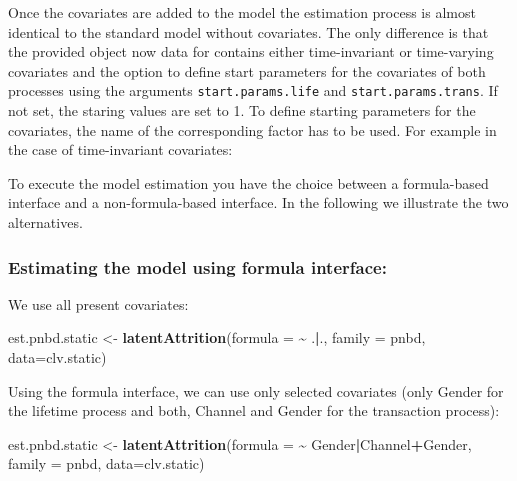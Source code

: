 \documentclass[
]{article}
\newenvironment{Shaded}{\begin{snugshade}}{\end{snugshade}}
\newcommand{\AttributeTok}[1]{\textcolor[rgb]{0.13,0.29,0.53}{#1}}
\newcommand{\FunctionTok}[1]{\textcolor[rgb]{0.13,0.29,0.53}{\textbf{#1}}}
\newcommand{\NormalTok}[1]{#1}
\newcommand{\OtherTok}[1]{\textcolor[rgb]{0.56,0.35,0.01}{#1}}
\newcommand{\SpecialCharTok}[1]{\textcolor[rgb]{0.81,0.36,0.00}{\textbf{#1}}}
\begin{document}
Once the covariates are added to the model the estimation process is
almost identical to the standard model without covariates. The only
difference is that the provided object now data for contains either
time-invariant or time-varying covariates and the option to define start
parameters for the covariates of both processes using the arguments
\texttt{start.params.life} and \texttt{start.params.trans}. If not set,
the staring values are set to 1. To define starting parameters for the
covariates, the name of the corresponding factor has to be used. For
example in the case of time-invariant covariates:

To execute the model estimation you have the choice between a
formula-based interface and a non-formula-based interface. In the
following we illustrate the two alternatives.

\subsubsection{\texorpdfstring{\textbf{Estimating the model using
formula
interface}:}{Estimating the model using formula interface:}}\label{estimating-the-model-using-formula-interface-2}

We use all present covariates:

\begin{Shaded}
\begin{Highlighting}[]
\NormalTok{  est.pnbd.static }\OtherTok{\textless{}{-}} \FunctionTok{latentAttrition}\NormalTok{(}\AttributeTok{formula =} \SpecialCharTok{\textasciitilde{}}\NormalTok{ .}\SpecialCharTok{|}\NormalTok{., }\AttributeTok{family =}\NormalTok{ pnbd, }\AttributeTok{data=}\NormalTok{clv.static)}
\end{Highlighting}
\end{Shaded}

Using the formula interface, we can use only selected covariates (only
Gender for the lifetime process and both, Channel and Gender for the
transaction process):

\begin{Shaded}
\begin{Highlighting}[]
\NormalTok{  est.pnbd.static }\OtherTok{\textless{}{-}} \FunctionTok{latentAttrition}\NormalTok{(}\AttributeTok{formula =} \SpecialCharTok{\textasciitilde{}}\NormalTok{ Gender}\SpecialCharTok{|}\NormalTok{Channel}\SpecialCharTok{+}\NormalTok{Gender, }
                                     \AttributeTok{family =}\NormalTok{ pnbd, }\AttributeTok{data=}\NormalTok{clv.static)}
\end{Highlighting}
\end{Shaded}
\end{document}
